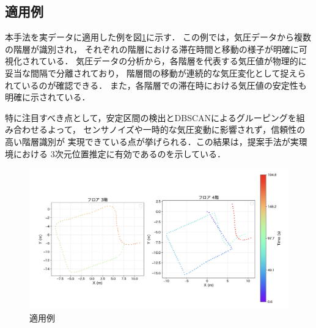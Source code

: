 \subsection{適用例}
本手法を実データに適用した例を図\ref{fig:move_between_floor}に示す．
この例では，気圧データから複数の階層が識別され，
それぞれの階層における滞在時間と移動の様子が明確に可視化されている．
気圧データの分析から，各階層を代表する気圧値が物理的に妥当な間隔で分離されており，
階層間の移動が連続的な気圧変化として捉えられているのが確認できる．
また，各階層での滞在時における気圧値の安定性も明確に示されている．

特に注目すべき点として，安定区間の検出とDBSCANによるグルーピングを組み合わせるよって，
センサノイズや一時的な気圧変動に影響されず，信頼性の高い階層識別が
実現できている点が挙げられる．この結果は，提案手法が実環境における
3次元位置推定に有効であるのを示している．


\begin{figure}[h]
	\centering
	\includegraphics[width=\linewidth]{../image/move_between_floor.jpg}
	\caption{適用例}    \label{fig:move_between_floor}
\end{figure}
